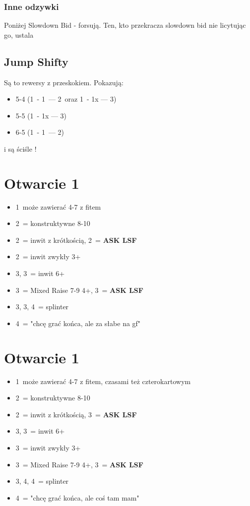 \documentclass[12pt, a4paper]{article}
\newcommand{\lsf}{\color{WildStrawberry}\textbf{ASK LSF}\color{black}}
\begin{document}
\subsubsection*{Inne odzywki}
Poniżej Slowdown Bid - forsują. Ten, kto przekracza slowdown bid nie licytując go, ustala \gf

\subsection*{Jump Shifty}
Są to rewersy z przeskokiem. Pokazują:
\begin{itemize}
    \item 5-4 (1\minor\ - 1\hearts\ --- 2\spades\ oraz 1\diams\ - 1x --- 3\clubs)
    \item 5-5 (1\major\ - 1x --- 3\minor)
    \item 6-5 (1\hearts\ - 1\nt\ --- 2\spades)
\end{itemize} 
i są ściśle \gf!



\pagebreak
\section{Otwarcie 1\hearts}
\begin{itemize}
    \item 1\nt\ może zawierać 4-7 z fitem
    \item 2\hearts\ = konstruktywne 8-10
    \item 2\spades\ = inwit z krótkością, 2\nt\ = \lsf
    \item 2\nt\ = inwit zwykły 3+\hearts
    \item 3\clubs, 3\diams\ = inwit 6+\minor
    \item 3\hearts\ = Mixed Raise 7-9 4+\hearts, 3\spades\ = \lsf
    \item 3\spades, 3\nt, 4\clubs\ = splinter
    \item 4\diams\ = "chcę grać końca, ale za słabe na gf"
\end{itemize}

\section{Otwarcie 1\spades}
\begin{itemize}
    \item 1\nt\ może zawierać 4-7 z fitem, czasami też czterokartowym
    \item 2\spades\ = konstruktywne 8-10
    \item 2\nt\ = inwit z krótkością, 3\clubs\ = \lsf
    \item 3\clubs, 3\diams\ = inwit 6+\minor
    \item 3\hearts\ = inwit zwykły 3+\spades
    \item 3\spades\ = Mixed Raise 7-9 4+\spades, 3\nt\ = \lsf
    \item 3\nt, 4\clubs, 4\diams\ = splinter
    \item 4\hearts\ = "chcę grać końca, ale coś tam mam"
\end{itemize}
\end{document}
